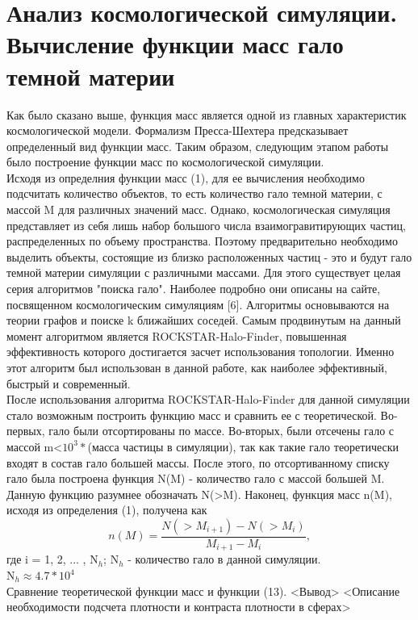 \documentclass[11pt]{article}
\begin{document}
\section{Анализ космологической симуляции. Вычисление функции масс гало темной материи}
Как было сказано выше, функция масс является одной из главных характеристик космологической модели. Формализм Пресса-Шехтера предсказывает определенный вид функции масс. Таким образом, следующим этапом работы было построение функции масс по космологической симуляции. \\
Исходя из определния функции масс (1), для ее вычисления необходимо подсчитать количество объектов, то есть количество гало темной материи, с массой M для различных значений масс. Однако, космологическая симуляция представляет из себя лишь набор большого числа взаимогравитирующих частиц, распределенных по объему пространства. Поэтому предварительно необходимо выделить объекты, состоящие из близко расположенных частиц - это и будут гало темной материи симуляции с различными массами. Для этого существует целая серия алгоритмов "поиска гало". Наиболее подробно они описаны на сайте, посвященном космологическим симуляциям [6]. Алгоритмы основываются на теории графов и поиске k ближайших соседей. Самым продвинутым на данный момент алгоритмом является ROCKSTAR-Halo-Finder, повышенная эффективность которого достигается засчет использования топологии. Именно этот алгоритм был использован в данной работе, как наиболее эффективный, быстрый и современный. \\

После использования алгоритма ROCKSTAR-Halo-Finder для данной симуляции стало возможным построить функцию масс и сравнить ее с теоретической. Во-первых, гало были отсортированы по массе. Во-вторых, были отсечены гало с массой m<$10^3*$(масса частицы в симуляции), так как такие гало теоретически входят в состав гало большей массы. После этого, по отсортиванному списку гало была построена функция N(M) - количество гало с массой большей M. Данную функцию разумнее обозначать N(>M). Наконец, функция масс n(M), исходя из определения (1), получена как 
\begin{equation}
n(M) = \frac{N(>M_{i+1})-N(>M_i)}{M_{i+1} - M_i},
\end{equation}
где i = 1, 2, ... , N$_{h}$; N$_{h}$ - количество гало в данной симуляции. \\
N$_{h}\approx 4.7*10^4$ \\
Сравнение теоретической функции масс и функции (13).
<Вывод>
<Описание необходимости подсчета плотности и контраста плотности в сферах>
\end{document}
